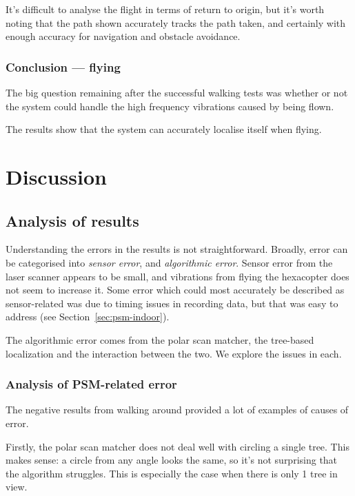 \documentclass[12pt,oneside,a4paper,draft]{book}
\begin{document}
It's difficult to analyse the flight in terms of return to origin, but
it's worth noting that the path shown accurately tracks the path
taken, and certainly with enough accuracy for navigation and obstacle
avoidance.
\newpage
\subsection{Conclusion --- flying}
\label{sec:conclusion-flying}

The big question remaining after the successful walking tests was
whether or not the system could handle the high frequency vibrations
caused by being flown. 

The results show that the system can accurately localise itself when
flying. 

\chapter{Discussion}
\label{cha:discussion}

\section{Analysis of results}
\label{sec:analysis-results}

Understanding the errors in the results is not
straightforward. Broadly, error can be categorised into \emph{sensor
  error}, and \emph{algorithmic error}. Sensor error from the laser
scanner appears to be small, and vibrations from flying the hexacopter
does not seem to increase it. Some error which could most accurately
be described as sensor-related was due to timing issues in recording
data, but that was easy to address (see Section~\ref{sec:psm-indoor}).

The algorithmic error comes from the polar scan matcher, the
tree-based localization and the interaction between the two. We
explore the issues in each.

\subsection{Analysis of PSM-related error}
\label{sec:psm-error}

The negative results from walking around provided a lot of examples of
causes of error.

Firstly, the polar scan matcher does not deal well with circling a
single tree. This makes sense: a circle from any angle looks the same,
so it's not surprising that the algorithm struggles. This is
especially the case when there is only 1 tree in view.
\end{document}
